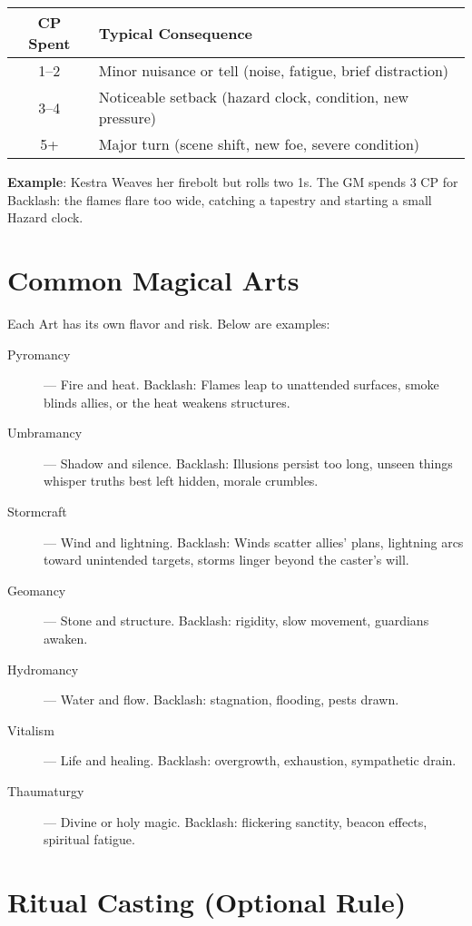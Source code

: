 \begin{center}
\begin{tabular}{cl}
\toprule
\textbf{CP Spent} & \textbf{Typical Consequence} \\
\midrule
1–2 & Minor nuisance or tell (noise, fatigue, brief distraction) \\
3–4 & Noticeable setback (hazard clock, condition, new pressure) \\
5+ & Major turn (scene shift, new foe, severe condition) \\
\bottomrule
\end{tabular}
\end{center}

\textbf{Example}: Kestra Weaves her firebolt but rolls two 1s. The GM spends 3 CP for Backlash: the flames flare too wide, catching a tapestry and starting a small Hazard clock.

\section*{Common Magical Arts}

Each Art has its own flavor and risk. Below are examples:

\begin{description}
    \item[Pyromancy] — Fire and heat. Backlash: Flames leap to unattended surfaces, smoke blinds allies, or the heat weakens structures.
    \item[Umbramancy] — Shadow and silence. Backlash: Illusions persist too long, unseen things whisper truths best left hidden, morale crumbles.
    \item[Stormcraft] — Wind and lightning. Backlash: Winds scatter allies' plans, lightning arcs toward unintended targets, storms linger beyond the caster's will.
    \item[Geomancy] — Stone and structure. Backlash: rigidity, slow movement, guardians awaken.
    \item[Hydromancy] — Water and flow. Backlash: stagnation, flooding, pests drawn.
    \item[Vitalism] — Life and healing. Backlash: overgrowth, exhaustion, sympathetic drain.
    \item[Thaumaturgy] — Divine or holy magic. Backlash: flickering sanctity, beacon effects, spiritual fatigue.
\end{description}

\section*{Ritual Casting (Optional Rule)}

